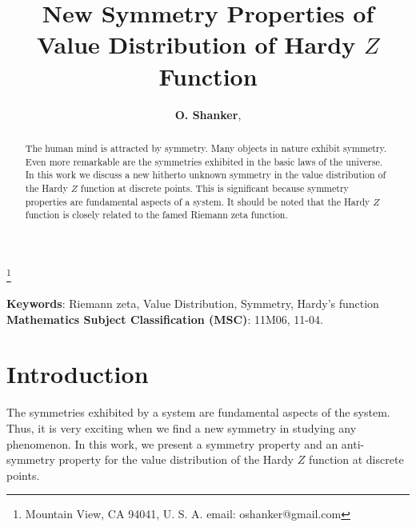 \documentclass[twoside]{article}
\begin{document}


\newtheorem{theorem}{Theorem}[section]
\newtheorem{lemma}[theorem]{Lemma}

\theoremstyle{definition}
\newtheorem{definition}[theorem]{Definition}
\newtheorem{example}[theorem]{Example}
\newtheorem{xca}[theorem]{Exercise}

\theoremstyle{remark}
\newtheorem{remark}[theorem]{Remark}



\date{}
\lhead[]{}
\rhead[]{}

\title{\bf{New Symmetry Properties of Value Distribution of Hardy $Z$ Function}}

\maketitle


\author{{\textbf{O. Shanker}},}
\thanks{ Mountain View, CA 94041, U. S. A. email: oshanker@gmail.com}

\thispagestyle{fancy}

\begin{abstract}
The human mind is attracted by symmetry. Many objects in nature exhibit symmetry.
Even more remarkable are the symmetries exhibited in the basic laws of the 
universe. In this work we discuss a new hitherto unknown symmetry in the value
distribution of the Hardy $Z$ function at discrete points. This is significant because symmetry properties
are fundamental aspects of a system. It should be noted that the Hardy $Z$ function is closely
related to the famed Riemann zeta function.

\end{abstract}
{\textbf {Keywords}:} Riemann zeta, Value Distribution, Symmetry, Hardy's function
{\textbf {Mathematics Subject Classification (MSC)}:} 11M06, 11-04.


\symbolfootnote[0]{\bf{* }}


\section{Introduction}

The symmetries exhibited by a system are fundamental aspects of the system. Thus, it is very exciting when we find a new symmetry in studying any phenomenon. In this work, we present a symmetry property and an anti-symmetry property for the value
distribution of the Hardy $Z$ function at discrete points.
\end{document}
